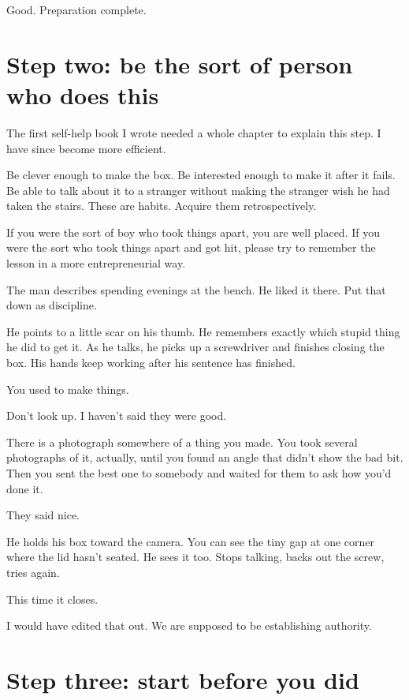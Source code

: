\documentclass[11pt,oneside]{book}
\begin{document}
Good. Preparation complete.

\section*{Step two: be the sort of person who does this}

The first self-help book I wrote needed a whole chapter to explain this step. I have since become more efficient.

Be clever enough to make the box. Be interested enough to make it after it fails. Be able to talk about it to a stranger without making the stranger wish he had taken the stairs. These are habits. Acquire them retrospectively.

If you were the sort of boy who took things apart, you are well placed. If you were the sort who took things apart and got hit, please try to remember the lesson in a more entrepreneurial way.

The man describes spending evenings at the bench. He liked it there. Put that down as discipline.

He points to a little scar on his thumb. He remembers exactly which stupid thing he did to get it. As he talks, he picks up a screwdriver and finishes closing the box. His hands keep working after his sentence has finished.

You used to make things.

Don't look up. I haven't said they were good.

There is a photograph somewhere of a thing you made. You took several photographs of it, actually, until you found an angle that didn't show the bad bit. Then you sent the best one to somebody and waited for them to ask how you'd done it.

They said nice.

He holds his box toward the camera. You can see the tiny gap at one corner where the lid hasn't seated. He sees it too. Stops talking, backs out the screw, tries again.

This time it closes.

I would have edited that out. We are supposed to be establishing authority.

\section*{Step three: start before you did}
\end{document}
